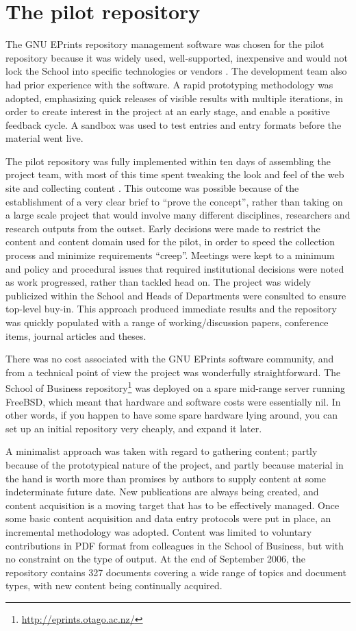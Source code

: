 \documentclass[12pt,pdftex,a4paper,titlepage]{article}
\begin{document}
\section{The pilot repository}

The GNU EPrints repository management software was chosen for the pilot repository because it was widely used, well-supported, inexpensive and would not lock the School into specific technologies or vendors \cite{Sale-A-2005-NZIRW}. The development team also had prior experience with the software. A rapid prototyping methodology was adopted, emphasizing quick releases of visible results with multiple iterations, in order to create interest in the project at an early stage, and enable a positive feedback cycle. A sandbox was used to test entries and entry formats before the material went live.

The pilot repository was fully implemented within ten days of assembling the project team, with most of this time spent tweaking the look and feel of the web site and collecting content \cite{Stan-N-2006-running}. This outcome was possible because of the establishment of a very clear brief to ``prove the concept'', rather than taking on a large scale project that would involve many different disciplines, researchers and research outputs from the outset. Early decisions were made to restrict the content and content domain used for the pilot, in order to speed the collection process and minimize requirements ``creep''. Meetings were kept to a minimum and policy and procedural issues that required institutional decisions were noted as work progressed, rather than tackled head on. The project was widely publicized within the School and Heads of Departments were consulted to ensure top-level buy-in. This approach produced immediate results and the repository was quickly populated with a range of working/discussion papers, conference items, journal articles and theses.

There was no cost associated with the GNU EPrints software community, and from a technical point of view the project was wonderfully straightforward. The School of Business repository\footnote{\url{http://eprints.otago.ac.nz/}} was deployed on a spare mid-range server running FreeBSD, which meant that hardware and software costs were essentially nil. In other words, if you happen to have some spare hardware lying around, you can set up an initial repository very cheaply, and expand it later.

A minimalist approach was taken with regard to gathering content; partly because of the prototypical nature of the project, and partly because material in the hand is worth more than promises by authors to supply content at some indeterminate future date. New publications are always being created, and content acquisition is a moving target that has to be effectively managed. Once some basic content acquisition and data entry protocols were put in place, an incremental methodology was adopted. Content was limited to voluntary contributions in PDF format from colleagues in the School of Business, but with no constraint on the type of output. At the end of September 2006, the repository contains 327 documents covering a wide range of topics and document types, with new content being continually acquired.
\end{document}

